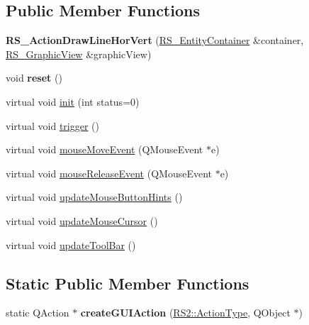 \subsection*{Public Member Functions}
\begin{DoxyCompactItemize}
\item 
\hypertarget{classRS__ActionDrawLineHorVert_a39eb926c06e8657e3473c227494352a7}{{\bfseries R\-S\-\_\-\-Action\-Draw\-Line\-Hor\-Vert} (\hyperlink{classRS__EntityContainer}{R\-S\-\_\-\-Entity\-Container} \&container, \hyperlink{classRS__GraphicView}{R\-S\-\_\-\-Graphic\-View} \&graphic\-View)}\label{classRS__ActionDrawLineHorVert_a39eb926c06e8657e3473c227494352a7}

\item 
\hypertarget{classRS__ActionDrawLineHorVert_afcb732c1834e622ddd667be0320425a7}{void {\bfseries reset} ()}\label{classRS__ActionDrawLineHorVert_afcb732c1834e622ddd667be0320425a7}

\item 
virtual void \hyperlink{classRS__ActionDrawLineHorVert_aa50fd84da48303b578bd3673aa33ddec}{init} (int status=0)
\item 
virtual void \hyperlink{classRS__ActionDrawLineHorVert_ac552544d3a1a2d0f5211d6ea9d4f1918}{trigger} ()
\item 
virtual void \hyperlink{classRS__ActionDrawLineHorVert_a6420c1283f68ad327640148affb8ec20}{mouse\-Move\-Event} (Q\-Mouse\-Event $\ast$e)
\item 
virtual void \hyperlink{classRS__ActionDrawLineHorVert_a8c27aa8c80b5e6c57301dd9dd94453a4}{mouse\-Release\-Event} (Q\-Mouse\-Event $\ast$e)
\item 
virtual void \hyperlink{classRS__ActionDrawLineHorVert_af8df0d9d18e1032ad0376eb53b92f562}{update\-Mouse\-Button\-Hints} ()
\item 
virtual void \hyperlink{classRS__ActionDrawLineHorVert_a53e237c713920e1afd29ea83d5bda4d9}{update\-Mouse\-Cursor} ()
\item 
virtual void \hyperlink{classRS__ActionDrawLineHorVert_a0473b50e59c51684846d2d814c537d60}{update\-Tool\-Bar} ()
\end{DoxyCompactItemize}
\subsection*{Static Public Member Functions}
\begin{DoxyCompactItemize}
\item 
\hypertarget{classRS__ActionDrawLineHorVert_add5f2acb6465550fbc8e30a28ebd2580}{static Q\-Action $\ast$ {\bfseries create\-G\-U\-I\-Action} (\hyperlink{classRS2_afe3523e0bc41fd637b892321cfc4b9d7}{R\-S2\-::\-Action\-Type}, Q\-Object $\ast$)}\label{classRS__ActionDrawLineHorVert_add5f2acb6465550fbc8e30a28ebd2580}

\end{DoxyCompactItemize}
